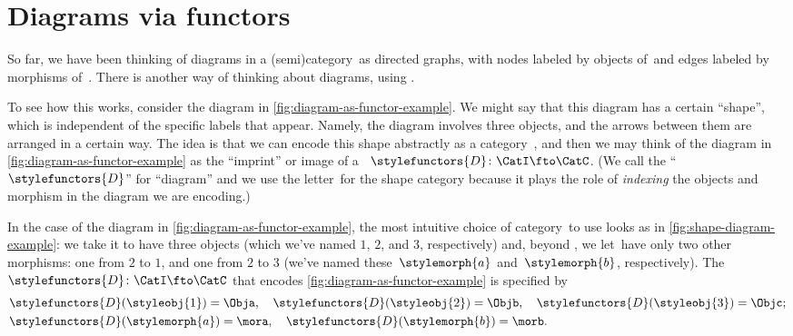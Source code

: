 
\section{Diagrams via functors}

So far, we have been thinking of diagrams in a (semi)category~\CatC as directed graphs, with nodes labeled by objects of~\CatC and edges labeled by morphisms of~\CatC.
There is another way of thinking about diagrams, using .

To see how this works, consider the diagram in \cref{fig:diagram-as-functor-example}.
We might say that this diagram has a certain ``shape'', which is independent of the specific labels that appear.
Namely, the diagram involves three objects, and the arrows between them are arranged in a certain way.
The idea is that we can encode this shape abstractly as a category~\CatI, and then we may think of the diagram in \cref{fig:diagram-as-functor-example} as the ``imprint'' or image of a ~$\stylefunctors{D}\colon \CatI \fto \CatC$.
(We call the  ``$\stylefunctors{D}$'' for ``diagram'' and we use the letter~\CatI for the shape category because it plays the role of \emph{indexing} the objects and morphism in the diagram we are encoding.)

\begin{marginfigure}
    \centering
    \caption{}
    \label{fig:diagram-as-functor-example}
\end{marginfigure}

\begin{marginfigure}
    \centering
    \caption{}
    \label{fig:shape-diagram-example}
\end{marginfigure}

In the case of the diagram in \cref{fig:diagram-as-functor-example}, the most intuitive choice of category~\CatI to use looks as in \cref{fig:shape-diagram-example}: we take it to have three objects (which we've named $1$, $2$, and $3$, respectively) and, beyond , we let~\CatI have only two other morphisms: one from $2$ to $1$, and one from $2$ to $3$ (we've named these~$\stylemorph{a}$ and~$\stylemorph{b}$, respectively).
The ~$\stylefunctors{D}\colon \CatI \fto \CatC$ that encodes \cref{fig:diagram-as-functor-example} is specified by
\begin{align}
     & \stylefunctors{D}(\styleobj{1}) = \Obja, \quad \stylefunctors{D}(\styleobj{2}) = \Objb, \quad  \stylefunctors{D}(\styleobj{3}) = \Objc; \\
     & \stylefunctors{D}(\stylemorph{a}) = \mora, \quad \stylefunctors{D}(\stylemorph{b}) = \morb.
\end{align}


